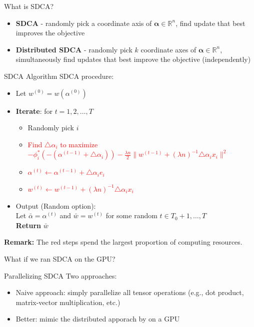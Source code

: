 \documentclass{beamer}
\def \R {\mathbb{R}}
\def \R {\mathbb{R}}
\begin{document}
\begin{frame}{What is SDCA?}
  \begin{itemize}
    \item \textbf{SDCA} - randomly pick a coordinate axis of $\mathbf{\alpha}
      \in \R^n$, find update that best improves
      the objective\vspace{1em}
    \item \textbf{Distributed SDCA} - randomly pick $k$ coordinate axes of
      $\mathbf{\alpha} \in \R^n$, simultaneously
      find updates that best improve the objective (independently)
  \end{itemize}
\end{frame}
\begin{frame}{SDCA Algorithm}
	SDCA procedure:
	\begin{itemize}
		\item Let $w^{(0)}=w(\alpha^{(0)})$
		\item \textbf{Iterate}: for $t=1,2,\ldots,T$
		\begin{itemize}
			\item Randomly pick $i$
			\item \textcolor{red}{Find $\triangle\alpha_i$ to maximize $-\phi_i^*(-(\alpha^{(t-1)}+\triangle\alpha_i))-\frac{\lambda n}{2}\|w^{(t-1)}+(\lambda n)^{-1}\triangle \alpha_i x_i\|^2$}
			\item \textcolor{red}{$\alpha^{(t)}\leftarrow\alpha^{(t-1)}+\triangle\alpha_ie_i$}
			\item \textcolor{red}{$w^{(t)}\leftarrow w^{(t-1)}+(\lambda n)^{-1}\triangle\alpha_i x_i$}
		\end{itemize}
	\item Output (Random option):\\
			Let $\bar{\alpha}=\alpha^{(t)}$ and $\bar{w}=w^{(t)}$ for some random $t\in T_0+1,\ldots,T$\\
	\textbf{Return} $\bar{w}$
	\end{itemize}
	\textbf{Remark:} The red steps spend the largest proportion of computing resources. 
\end{frame}

\begin{frame}[standout]
  What if we ran SDCA on the GPU?
\end{frame}

\begin{frame}{Parallelizing SDCA}
  Two approaches:
	\begin{itemize}
    \item Naive approach: simply parallelize all tensor operations (e.g., dot
      product, matrix-vector multiplication, etc.) \pause
  \item Better: mimic the distributed apporach by \cite{yang2013trading} on a GPU
	\end{itemize}
\end{frame}
\end{document}
